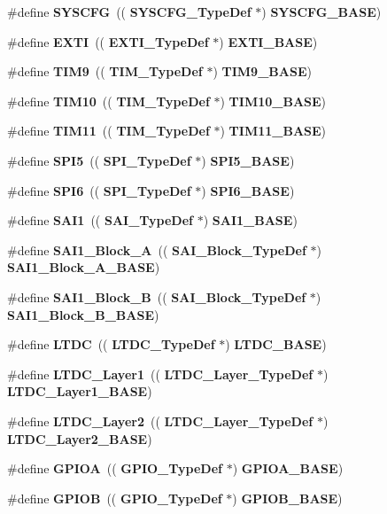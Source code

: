 \begin{DoxyCompactItemize}
\#define \textbf{ S\+Y\+S\+C\+FG}~((\textbf{ S\+Y\+S\+C\+F\+G\+\_\+\+Type\+Def} $\ast$) \textbf{ S\+Y\+S\+C\+F\+G\+\_\+\+B\+A\+SE})
\item 
\#define \textbf{ E\+X\+TI}~((\textbf{ E\+X\+T\+I\+\_\+\+Type\+Def} $\ast$) \textbf{ E\+X\+T\+I\+\_\+\+B\+A\+SE})
\item 
\#define \textbf{ T\+I\+M9}~((\textbf{ T\+I\+M\+\_\+\+Type\+Def} $\ast$) \textbf{ T\+I\+M9\+\_\+\+B\+A\+SE})
\item 
\#define \textbf{ T\+I\+M10}~((\textbf{ T\+I\+M\+\_\+\+Type\+Def} $\ast$) \textbf{ T\+I\+M10\+\_\+\+B\+A\+SE})
\item 
\#define \textbf{ T\+I\+M11}~((\textbf{ T\+I\+M\+\_\+\+Type\+Def} $\ast$) \textbf{ T\+I\+M11\+\_\+\+B\+A\+SE})
\item 
\#define \textbf{ S\+P\+I5}~((\textbf{ S\+P\+I\+\_\+\+Type\+Def} $\ast$) \textbf{ S\+P\+I5\+\_\+\+B\+A\+SE})
\item 
\#define \textbf{ S\+P\+I6}~((\textbf{ S\+P\+I\+\_\+\+Type\+Def} $\ast$) \textbf{ S\+P\+I6\+\_\+\+B\+A\+SE})
\item 
\#define \textbf{ S\+A\+I1}~((\textbf{ S\+A\+I\+\_\+\+Type\+Def} $\ast$) \textbf{ S\+A\+I1\+\_\+\+B\+A\+SE})
\item 
\#define \textbf{ S\+A\+I1\+\_\+\+Block\+\_\+A}~((\textbf{ S\+A\+I\+\_\+\+Block\+\_\+\+Type\+Def} $\ast$)\textbf{ S\+A\+I1\+\_\+\+Block\+\_\+\+A\+\_\+\+B\+A\+SE})
\item 
\#define \textbf{ S\+A\+I1\+\_\+\+Block\+\_\+B}~((\textbf{ S\+A\+I\+\_\+\+Block\+\_\+\+Type\+Def} $\ast$)\textbf{ S\+A\+I1\+\_\+\+Block\+\_\+\+B\+\_\+\+B\+A\+SE})
\item 
\#define \textbf{ L\+T\+DC}~((\textbf{ L\+T\+D\+C\+\_\+\+Type\+Def} $\ast$)\textbf{ L\+T\+D\+C\+\_\+\+B\+A\+SE})
\item 
\#define \textbf{ L\+T\+D\+C\+\_\+\+Layer1}~((\textbf{ L\+T\+D\+C\+\_\+\+Layer\+\_\+\+Type\+Def} $\ast$)\textbf{ L\+T\+D\+C\+\_\+\+Layer1\+\_\+\+B\+A\+SE})
\item 
\#define \textbf{ L\+T\+D\+C\+\_\+\+Layer2}~((\textbf{ L\+T\+D\+C\+\_\+\+Layer\+\_\+\+Type\+Def} $\ast$)\textbf{ L\+T\+D\+C\+\_\+\+Layer2\+\_\+\+B\+A\+SE})
\item 
\#define \textbf{ G\+P\+I\+OA}~((\textbf{ G\+P\+I\+O\+\_\+\+Type\+Def} $\ast$) \textbf{ G\+P\+I\+O\+A\+\_\+\+B\+A\+SE})
\item 
\#define \textbf{ G\+P\+I\+OB}~((\textbf{ G\+P\+I\+O\+\_\+\+Type\+Def} $\ast$) \textbf{ G\+P\+I\+O\+B\+\_\+\+B\+A\+SE})
\item 

\end{DoxyCompactItemize}
